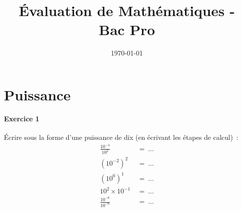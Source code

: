\documentclass[a4paper]{article}
\begin{document}
  \title{Évaluation de Mathématiques - Bac Pro}
  \author{}
  \date{\today}
  \maketitle
  
  \section{Puissance}
  \paragraph{Exercice 1}
  Écrire sous la forme d'une puissance de dix (en écrivant les étapes de calcul)~:
  \begin{align*}
    \frac{10^{-4}}{10^2} &\ = \ \dots\\
    (10^{-2})^2&\ = \ \dots\\
    (10^0)^1&\ = \ \dots\\
    10^2 \times 10^{-1}&\ = \ \dots\\
    \frac{10^{-6}}{10^{-6}}&\ = \ \dots
\end{align*}
\end{document}
